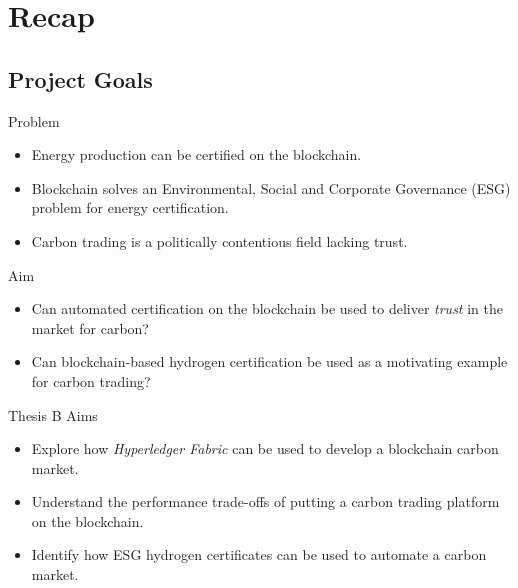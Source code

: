 \section{Recap}
\subsection{Project Goals}
\begin{frame}{Problem}
    \begin{itemize}
        \item Energy production can be certified on the blockchain.
        \item Blockchain solves an Environmental,
              Social and Corporate Governance (ESG)
              problem for energy certification.
        \item Carbon trading is a politically contentious field lacking trust.
    \end{itemize}
\end{frame}
\begin{frame}{Aim}
    \begin{itemize}
        \item Can automated certification
              on the blockchain be used to deliver \textit{trust} in the market
              for carbon?
        \item Can blockchain-based hydrogen certification be used as a motivating
              example for carbon trading?
    \end{itemize}
\end{frame}
\begin{frame}{Thesis B Aims}
    \begin{itemize}
        \item Explore how \textit{Hyperledger Fabric} can be used to develop
              a blockchain carbon market.
        \item Understand the performance trade-offs
              of putting a carbon trading platform
              on the blockchain.
        \item Identify how ESG hydrogen certificates can be used to automate
              a carbon market.
    \end{itemize}
\end{frame}